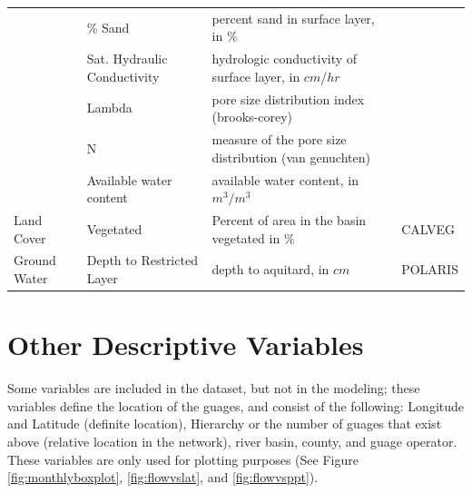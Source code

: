 \begin{longtable}[h]{p{2cm}p{2.55cm}p{8.04cm}p{2.24cm}}
	 & \% Sand & percent sand in surface layer, in $\%$ &  \\
	 & Sat. Hydraulic Conductivity & hydrologic conductivity of surface layer, in $cm$/$hr$ &  \\
	 & Lambda & pore size distribution index (brooks-corey) & \\
	 & N & measure of the pore size distribution (van genuchten) & \\
	 & Available water content & available water content, in $m^3/m^3$ & \\ 
	\hline
	Land Cover & Vegetated & Percent of area in the basin vegetated in $\%$ & CALVEG \cite{calveg2004vegetation} \\
	\hline
	Ground Water & Depth to Restricted Layer & depth to aquitard, in $cm$ & POLARIS \cite{chaney2016polaris}\\
	\hline
	\end{longtable}
	\label{table:ufvariables}
\endgroup

\section*{Other Descriptive Variables}
Some variables are included in the dataset, but not in the modeling; these variables define the location of the guages, and consist of the following: Longitude and Latitude (definite location), Hierarchy or the number of guages that exist above (relative location in the network), river basin, county, and guage operator. These variables are only used for plotting purposes (See Figure \ref{fig:monthlyboxplot}, \ref{fig:flowvslat}, and \ref{fig:flowvsppt}). 

